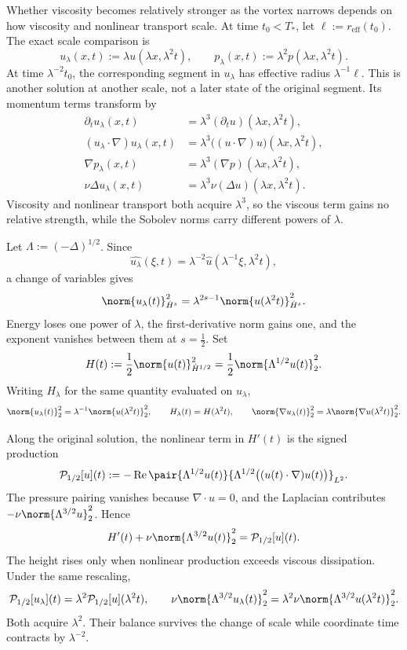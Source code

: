 
Whether viscosity becomes relatively stronger as the vortex narrows depends on how viscosity and nonlinear transport scale.
At time \(t_0<T_*\), let \(\ell:=r_{\mathrm{eff}}(t_0)\). The exact scale comparison is
\[
  u_\lambda(x,t)
  :=
  \lambda u(\lambda x,\lambda^2t),
  \qquad
  p_\lambda(x,t)
  :=
  \lambda^2p(\lambda x,\lambda^2t).
\]
At time \(\lambda^{-2}t_0\), the corresponding segment in \(u_\lambda\) has effective radius \(\lambda^{-1}\ell\). This is another solution at another scale, not a later state of the original segment. Its momentum terms transform by
\[
\begin{aligned}
  \partial_tu_\lambda(x,t)
  &=
  \lambda^3(\partial_tu)(\lambda x,\lambda^2t),
  \\
  (u_\lambda\cdot\nabla)u_\lambda(x,t)
  &=
  \lambda^3\bigl((u\cdot\nabla)u\bigr)(\lambda x,\lambda^2t),
  \\
  \nabla p_\lambda(x,t)
  &=
  \lambda^3(\nabla p)(\lambda x,\lambda^2t),
  \\
  \nu\Delta u_\lambda(x,t)
  &=
  \lambda^3\nu(\Delta u)(\lambda x,\lambda^2t).
\end{aligned}
\]
Viscosity and nonlinear transport both acquire \(\lambda^3\), so the viscous term gains no relative strength, while the Sobolev norms carry different powers of \(\lambda\).


Let \(\Lambda:=(-\Delta)^{1/2}\). Since
\[
  \widehat{u_\lambda}(\xi,t)
  =
  \lambda^{-2}\widehat u(\lambda^{-1}\xi,\lambda^2t),
\]
a change of variables gives
\[
  \norm{u_\lambda(t)}_{\dot H^s}^2
  =
  \lambda^{2s-1}
  \norm{u(\lambda^2t)}_{\dot H^s}^2.
\]
Energy loses one power of \(\lambda\), the first-derivative norm gains one, and the exponent vanishes between them at \(s=\tfrac12\). Set
\[
  H(t)
  :=
  \frac12\norm{u(t)}_{\dot H^{1/2}}^2
  =
  \frac12\norm{\Lambda^{1/2}u(t)}_2^2.
\]
Writing \(H_\lambda\) for the same quantity evaluated on \(u_\lambda\),
\[
  \norm{u_\lambda(t)}_2^2
  =
  \lambda^{-1}\norm{u(\lambda^2t)}_2^2,
  \qquad
  H_\lambda(t)=H(\lambda^2t),
  \qquad
  \norm{\nabla u_\lambda(t)}_2^2
  =
  \lambda\norm{\nabla u(\lambda^2t)}_2^2.
\]


Along the original solution, the nonlinear term in \(H'(t)\) is the signed production
\[
  \mathcal P_{1/2}[u](t)
  :=
  -\operatorname{Re}
  \pair
    {\Lambda^{1/2}u(t)}
    {\Lambda^{1/2}\bigl((u(t)\cdot\nabla)u(t)\bigr)}_{L^2}.
\]
The pressure pairing vanishes because \(\nabla\cdot u=0\), and the Laplacian contributes \(-\nu\norm{\Lambda^{3/2}u}_2^2\). Hence
\[
  H'(t)
  +
  \nu\norm{\Lambda^{3/2}u(t)}_2^2
  =
  \mathcal P_{1/2}[u](t).
\]
The height rises only when nonlinear production exceeds viscous dissipation. Under the same rescaling,
\[
  \mathcal P_{1/2}[u_\lambda](t)
  =
  \lambda^2\mathcal P_{1/2}[u](\lambda^2t),
  \qquad
  \nu\norm{\Lambda^{3/2}u_\lambda(t)}_2^2
  =
  \lambda^2\nu\norm{\Lambda^{3/2}u(\lambda^2t)}_2^2.
\]
Both acquire \(\lambda^2\). Their balance survives the change of scale while coordinate time contracts by \(\lambda^{-2}\).

